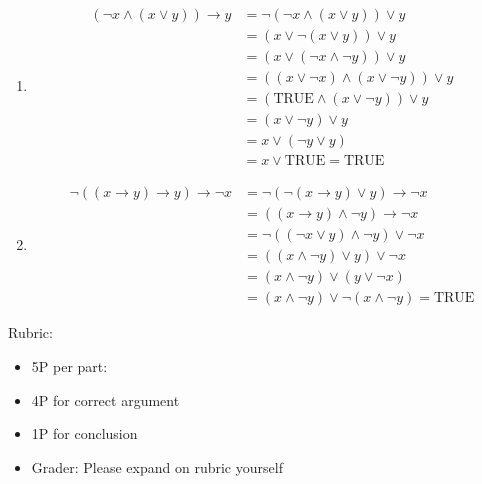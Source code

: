 \documentclass{article}
\theoremstyle{definition}
\begin{document}
\begin{solution}
\begin{enumerate}
        \item
        \begin{align*}
            (\neg x \wedge (x \vee y)) \rightarrow y
            &=\neg(\neg x \wedge (x \vee y)) \vee y
          \\&=(x \vee \neg(x \vee y)) \vee y 
          \\&=(x \vee (\neg x \wedge \neg y)) \vee y 
          \\ &=((x \vee \neg x) \wedge ( x \vee \neg y)) \vee y 
          \\ &=(\mathrm{TRUE} \wedge ( x \vee \neg y)) \vee y 
          \\ &=( x \vee \neg y) \vee y 
          \\ &= x \vee (\neg y \vee y )
          \\ &=x \vee \mathrm{TRUE} = \mathrm{TRUE}
        \end{align*}
        \item
        \begin{align*}
            \neg ( (x \rightarrow y) \rightarrow  y) \rightarrow \neg x
            &= \neg ( \neg (x \rightarrow y) \vee  y) \rightarrow \neg x
          \\&= ( (x \rightarrow y) \wedge  \neg y) \rightarrow \neg x
          \\&= \neg ( (\neg x \vee y) \wedge  \neg y) \vee \neg x
          \\&= ( (x \wedge \neg y) \vee   y) \vee \neg x
          \\&= (x \wedge \neg y) \vee   (y \vee \neg x)
          \\&= (x \wedge \neg y) \vee  \neg (x \wedge \neg y) = \mathrm{TRUE}
        \end{align*}
    \end{enumerate}
{\color{red} Rubric:
\begin{itemize}
\item 5P per part: 
\item 4P for correct argument
\item 1P for conclusion
\item Grader: Please expand on rubric yourself
\end{itemize}}
\end{solution}
\end{document}
